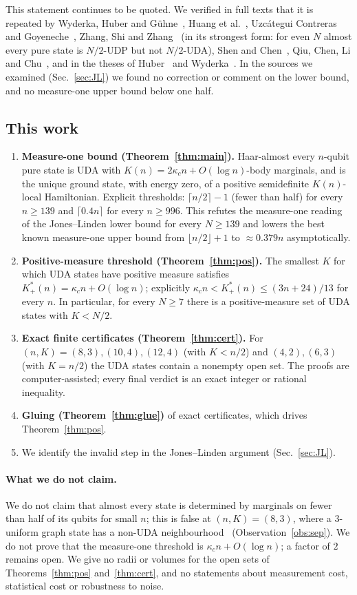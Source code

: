 \documentclass[aps,pra,onecolumn,superscriptaddress,nofootinbib,longbibliography,10pt]{revtex4-2}
\theoremstyle{definition}
\newcommand{\kc}{\kappa_c}
\newcommand{\Kp}{K^{*}_{+}}
\begin{document}
This statement continues to be quoted. We verified in full texts that it is repeated by Wyderka, Huber and Gühne~\cite{WHG17}, Huang et al.~\cite{HCLZ18}, Uzcátegui Contreras and Goyeneche~\cite{UG22}, Zhang, Shi and Zhang~\cite{ZSZ24} (in its strongest form: for even $N$ almost every pure state is $N/2$-UDP but not $N/2$-UDA), Shen and Chen~\cite{SC23}, Qiu, Chen, Li and Chu~\cite{QCLC25}, and in the theses of Huber~\cite{Hub17} and Wyderka~\cite{Wyd20}. In the sources we examined (Sec.~\ref{sec:JL}) we found no correction or comment on the lower bound, and no measure-one upper bound below one half.

\subsection*{This work}
\begin{enumerate}
\item \textbf{Measure-one bound (Theorem~\ref{thm:main}).} Haar-almost every $n$-qubit pure state is UDA with $K(n)=2\kc n+O(\log n)$-body marginals, and is the unique ground state, with energy zero, of a positive semidefinite $K(n)$-local Hamiltonian. Explicit thresholds: $\lceil n/2\rceil-1$ (fewer than half) for every $n\ge139$ and $\lceil0.4n\rceil$ for every $n\ge996$. This refutes the measure-one reading of the Jones--Linden lower bound for every $N\ge139$ and lowers the best known measure-one upper bound from $\lfloor n/2\rfloor+1$ to $\approx0.379n$ asymptotically.
\item \textbf{Positive-measure threshold (Theorem~\ref{thm:pos}).} The smallest $K$ for which UDA states have positive measure satisfies $\Kp(n)=\kc n+O(\log n)$; explicitly $\kc n<\Kp(n)\le(3n+24)/13$ for every $n$. In particular, for every $N\ge7$ there is a positive-measure set of UDA states with $K<N/2$.
\item \textbf{Exact finite certificates (Theorem~\ref{thm:cert}).} For $(n,K)=(8,3),(10,4),(12,4)$ (with $K<n/2$) and $(4,2),(6,3)$ (with $K=n/2$) the UDA states contain a nonempty open set. The proofs are computer-assisted; every final verdict is an exact integer or rational inequality.
\item \textbf{Gluing (Theorem~\ref{thm:glue})} of exact certificates, which drives Theorem~\ref{thm:pos}.
\item We identify the invalid step in the Jones--Linden argument (Sec.~\ref{sec:JL}).
\end{enumerate}

\paragraph*{What we do not claim.} We do not claim that almost every state is determined by marginals on fewer than half of its qubits for small $n$; this is false at $(n,K)=(8,3)$, where a $3$-uniform graph state has a non-UDA neighbourhood~\cite{HG16} (Observation~\ref{obs:sep}). We do not prove that the measure-one threshold is $\kc n+O(\log n)$; a factor of $2$ remains open. We give no radii or volumes for the open sets of Theorems~\ref{thm:pos} and~\ref{thm:cert}, and no statements about measurement cost, statistical cost or robustness to noise.
\end{document}
